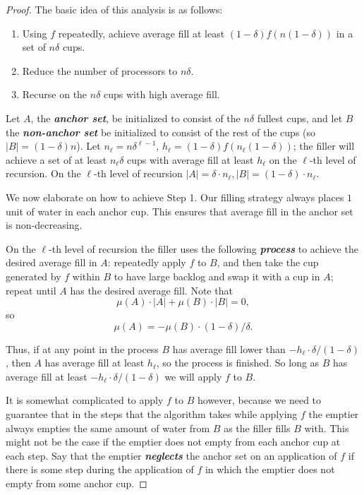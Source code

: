 \documentclass[twocolumn]{article}[10pt]
\newcommand{\defn}[1]{{\textit{\textbf{\boldmath #1}}}\xspace}
\begin{document}
\begin{proof}
  The basic idea of this analysis is as follows:
  \begin{enumerate}
    \item Using $f$ repeatedly, achieve average fill at least $(1-\delta)
      f(n(1-\delta))$ in a set of $n\delta$ cups. 
    \item Reduce the number of processors to $n\delta$.
    \item Recurse on the $n\delta$ cups with high average fill.
  \end{enumerate}

  Let $A$, the \defn{anchor set}, be initialized to consist of the $n\delta$
  fullest cups, and let $B$ the \defn{non-anchor set} be initialized to consist
  of the rest of the cups (so $|B| = (1-\delta)n$).
  Let $n_\ell = n\delta^{\ell-1}$, $h_\ell = (1-\delta)f(n_\ell(1-\delta))$;
  the filler will achieve a set of at least $n_\ell \delta$ cups with average
  fill at least $h_\ell$ on the $\ell$-th
  level of recursion. On the $\ell$-th level of recursion $|A| = \delta\cdot
  n_\ell, |B| = (1-\delta)\cdot n_\ell$.

  We now elaborate on how to achieve Step 1.
  Our filling strategy always places $1$ unit of water in each anchor cup. This
  ensures that average fill in the anchor set is non-decreasing.

  On the $\ell$-th level of recursion the filler uses the following
  \defn{process} to achieve the desired average fill in $A$: repeatedly apply
  $f$ to $B$, and then take the cup generated by $f$ within $B$ to have large
  backlog and swap it with a cup in $A$; repeat until $A$ has the desired
  average fill. Note that $$\mu(A) \cdot |A| +\mu(B)\cdot |B| = 0,$$ so
  $$\mu(A) = - \mu(B) \cdot (1-\delta)/ \delta.$$

  Thus, if at any point in the process $B$ has average fill lower than $-h_\ell
  \cdot \delta/(1-\delta)$, then $A$ has average fill at least $h_\ell$, so the
  process is finished. So long as $B$ has average fill at least $-h_\ell\cdot
  \delta/(1-\delta)$ we will apply $f$ to $B$.
  
  It is somewhat complicated to apply $f$ to $B$ however, because we need to
  guarantee that in the steps that the algorithm takes while applying $f$ the
  emptier always empties the same amount of water from $B$ as the filler fills
  $B$ with. This might not be the case if the emptier does not empty from each
  anchor cup at each step. Say that the emptier \defn{neglects} the anchor set
  on an application of $f$ if there is some step during the application of $f$
  in which the emptier does not empty from some anchor cup.


\end{proof}
\end{document}

